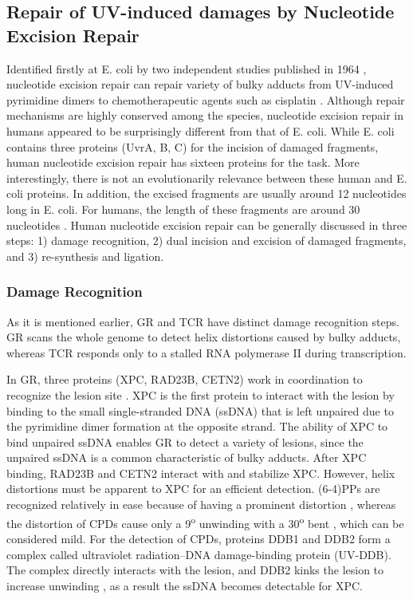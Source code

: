\subsection{Repair of UV-induced damages by Nucleotide Excision Repair}

Identified firstly at E. coli by two independent studies published in 1964 \citep{boyce1964release,setlow1964disappearance}, nucleotide excision repair can repair variety of bulky adducts from UV-induced pyrimidine dimers to chemotherapeutic agents such as cisplatin \citep{yimit2019differential}. Although repair mechanisms are highly conserved among the species, nucleotide excision repair in humans appeared to be surprisingly different from that of E. coli. While E. coli contains three proteins (UvrA, B, C) for the incision of damaged fragments, human nucleotide excision repair has sixteen proteins for the task. More interestingly, there is not an evolutionarily relevance between these human and E. coli proteins. In addition, the excised fragments are usually around 12 nucleotides long in E. coli. For humans, the length of these fragments are around 30 nucleotides \citep{sancar2016mechanisms}. Human nucleotide excision repair can be generally discussed in three steps: 1) damage recognition, 2) dual incision and excision of damaged fragments, and 3) re-synthesis and ligation.  

\subsubsection{Damage Recognition}

As it is mentioned earlier, GR and TCR have distinct damage recognition steps. GR scans the whole genome to detect helix distortions caused by bulky adducts, whereas TCR responds only to a stalled RNA polymerase II during transcription. 

In GR, three proteins (XPC, RAD23B, CETN2) work in coordination to recognize the lesion site \citep{sugasawa1998xeroderma}. XPC is the first protein to interact with the lesion by binding to the small single-stranded DNA (ssDNA) that is left unpaired due to the pyrimidine dimer formation at the opposite strand. The ability of XPC to bind unpaired ssDNA enables GR to detect a variety of lesions, since the unpaired ssDNA is a common characteristic of bulky adducts. After XPC binding, RAD23B and CETN2 interact with and stabilize XPC. However, helix distortions must be apparent to XPC for an efficient detection. (6-4)PPs are recognized relatively in ease because of having a prominent distortion \citep{mizukoshi2001structural}, whereas the distortion of CPDs cause only a 9\textsuperscript{o} unwinding with a 30\textsuperscript{o} bent \citep{park2002crystal}, which can be considered mild. For the detection of CPDs, proteins DDB1 and DDB2 form a complex called ultraviolet radiation–DNA damage-binding protein (UV-DDB). The complex directly interacts with the lesion, and DDB2 kinks the lesion to increase unwinding \citep{scrima2008structural}, as a result the ssDNA becomes detectable for XPC. 

